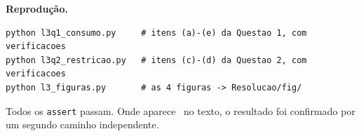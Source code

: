 \documentclass[11pt, a4paper]{article}
\newcommand{\passo}[1]{\medskip\noindent\textbf{#1}\par\nobreak}
\begin{document}
\passo{Reprodução.}

\begin{tcolorbox}[colback=gray!7, colframe=gray!50, arc=2pt, boxrule=0.4pt]
\footnotesize
\begin{verbatim}
python l3q1_consumo.py     # itens (a)-(e) da Questao 1, com verificacoes
python l3q2_restricao.py   # itens (c)-(d) da Questao 2, com verificacoes
python l3_figuras.py       # as 4 figuras -> Resolucao/fig/
\end{verbatim}
\end{tcolorbox}

Todos os \texttt{assert} passam. Onde aparece \checkmark\ no texto, o resultado foi
confirmado por um segundo caminho independente.
\end{document}
